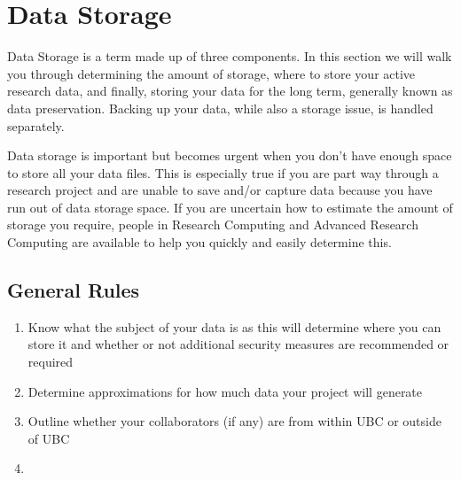 \documentclass[
]{book}
\providecommand{\tightlist}{%
  \setlength{\itemsep}{0pt}\setlength{\parskip}{0pt}}
\begin{document}
\hypertarget{data-storage-1}{%
\chapter*{Data Storage}\label{data-storage-1}}

Data Storage is a term made up of three components. In this section we will walk you through determining the amount of storage, where to store your active research data, and finally, storing your data for the long term, generally known as data preservation. Backing up your data, while also a storage issue, is handled separately.

Data storage is important but becomes urgent when you don't have enough space to store all your data files. This is especially true if you are part way through a research project and are unable to save and/or capture data because you have run out of data storage space. If you are uncertain how to estimate the amount of storage you require, people in Research Computing and Advanced Research Computing are available to help you quickly and easily determine this.

\hypertarget{general-rules-4}{%
\section*{General Rules}\label{general-rules-4}}

\begin{enumerate}
\def\labelenumi{\arabic{enumi}.}
\tightlist
\item
  Know what the subject of your data is as this will determine where you can store it and whether or not additional security measures are recommended or required
\item
  Determine approximations for how much data your project will generate
\item
  Outline whether your collaborators (if any) are from within UBC or outside of UBC
\item
\end{enumerate}
\end{document}

